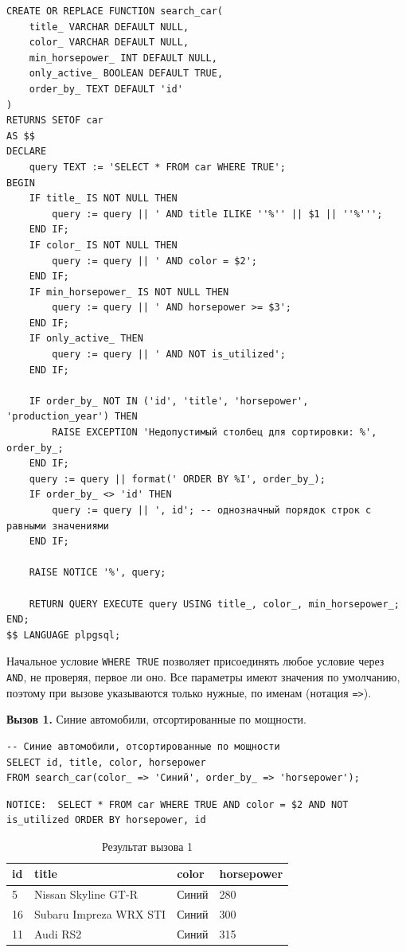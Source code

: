 \documentclass[oneside,a4paper,14pt]{extarticle}
\begin{document}
\begin{verbatim}
CREATE OR REPLACE FUNCTION search_car(
    title_ VARCHAR DEFAULT NULL,
    color_ VARCHAR DEFAULT NULL,
    min_horsepower_ INT DEFAULT NULL,
    only_active_ BOOLEAN DEFAULT TRUE,
    order_by_ TEXT DEFAULT 'id'
)
RETURNS SETOF car
AS $$
DECLARE
    query TEXT := 'SELECT * FROM car WHERE TRUE';
BEGIN
    IF title_ IS NOT NULL THEN
        query := query || ' AND title ILIKE ''%'' || $1 || ''%''';
    END IF;
    IF color_ IS NOT NULL THEN
        query := query || ' AND color = $2';
    END IF;
    IF min_horsepower_ IS NOT NULL THEN
        query := query || ' AND horsepower >= $3';
    END IF;
    IF only_active_ THEN
        query := query || ' AND NOT is_utilized';
    END IF;

    IF order_by_ NOT IN ('id', 'title', 'horsepower', 'production_year') THEN
        RAISE EXCEPTION 'Недопустимый столбец для сортировки: %', order_by_;
    END IF;
    query := query || format(' ORDER BY %I', order_by_);
    IF order_by_ <> 'id' THEN
        query := query || ', id'; -- однозначный порядок строк с равными значениями
    END IF;

    RAISE NOTICE '%', query;

    RETURN QUERY EXECUTE query USING title_, color_, min_horsepower_;
END;
$$ LANGUAGE plpgsql;
\end{verbatim}

Начальное условие \texttt{WHERE TRUE} позволяет присоединять любое условие через \texttt{AND}, не проверяя, первое ли оно. Все параметры имеют значения по умолчанию, поэтому при вызове указываются только нужные, по именам (нотация \texttt{=>}).

\textbf{Вызов 1.} Синие автомобили, отсортированные по мощности.

\begin{verbatim}
-- Синие автомобили, отсортированные по мощности
SELECT id, title, color, horsepower
FROM search_car(color_ => 'Синий', order_by_ => 'horsepower');
\end{verbatim}

\begin{Verbatim}[fontsize=\footnotesize,breaklines=true]
NOTICE:  SELECT * FROM car WHERE TRUE AND color = $2 AND NOT is_utilized ORDER BY horsepower, id
\end{Verbatim}

\begin{table}[H]
\centering
\footnotesize
\caption{Результат вызова 1}\label{tab:dyn1}
\begin{tabular}{|l|l|l|l|}
\hline
\textbf{id} & \textbf{title} & \textbf{color} & \textbf{horsepower} \\ \hline
5 & Nissan Skyline GT-R & Синий & 280 \\ \hline
16 & Subaru Impreza WRX STI & Синий & 300 \\ \hline
11 & Audi RS2 & Синий & 315 \\ \hline
\end{tabular}
\end{table}
\end{document}
